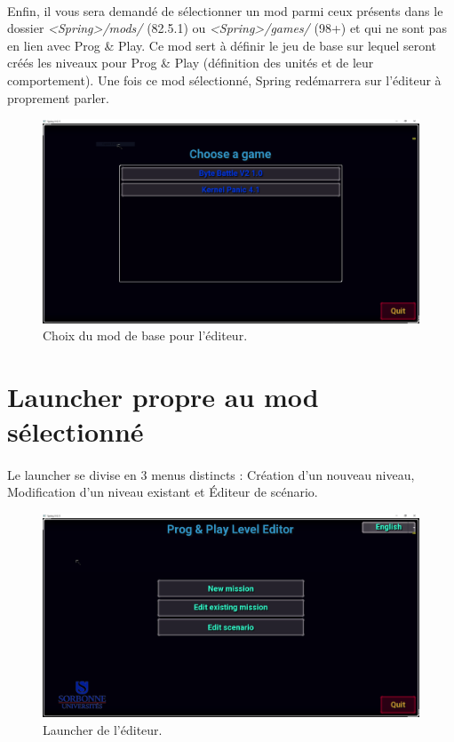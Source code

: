 \documentclass[a4paper]{article}
\begin{document}
\paragraph{ }
Enfin, il vous sera demandé de sélectionner un mod parmi ceux présents dans le dossier \textit{<Spring>/mods/} (82.5.1) ou \textit{<Spring>/games/} (98+) et qui ne sont pas en lien avec Prog \& Play. Ce mod sert à définir le jeu de base sur lequel seront créés les niveaux pour Prog \& Play (définition des unités et de leur comportement). Une fois ce mod sélectionné, Spring redémarrera sur l'éditeur à proprement parler.
\begin{figure}[H]
\centering
\includegraphics[width=\linewidth]{pre-launcher.png}
\caption{Choix du mod de base pour l'éditeur.}
\label{fig:pre-launcher}
\end{figure}
\section{Launcher propre au mod sélectionné}
\paragraph{ }
Le launcher se divise en 3 menus distincts : Création d'un nouveau niveau, Modification d'un niveau existant et Éditeur de scénario.
\begin{figure}[H]
\centering
\includegraphics[width=\linewidth]{launcher-main.png}
\caption{Launcher de l'éditeur.}
\label{fig:launcher-main}
\end{figure}
\end{document}
